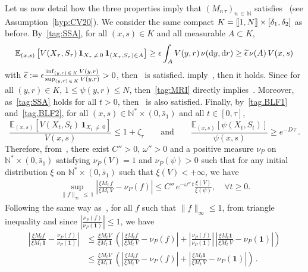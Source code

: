 \documentclass[10pt]{amsart}
\theoremstyle{definition}\newtheorem{defi}[theo]{Definition}\newtheorem{rema}[theo]{Remark}\newtheorem{exam}[theo]{Example}\newtheorem{exem}[theo]{Example}\newtheorem{nota}[theo]{Notation}
\newcommand{\llbracket}{\mathopen{[\mkern -2.7mu[}}
\newcommand{\rrbracket}{\mathclose{]\mkern -2.7mu]}}
\newcommand{\NN}{\mathbb{N}}
\newcommand{\EE}{\mathbb{E}}
\newcommand{\X}{\NN^* \times (0,\bar s_1)}
\newcommand{\dif}{\mathrm{d}}
\newcommand{\1}{\mathbf{1}}
\let\oldtilde\tilde
\renewcommand*{\tilde}[1]{\mathchoice{\widetilde{#1}}{\widetilde{#1}}{\oldtilde{#1}}{\oldtilde{#1}}}
\let\oldforall\forall
\renewcommand*{\forall}{\mathrel{\oldforall}}
\begin{document}
Let us now detail how the three properties imply that $(M_{n\,\tau})_{n\,\in\,\NN}$ satisfies~\cite[Assumption~G]{CV20} (see Assumption~\ref{hyp:CV20}). We consider the same compact $K=\llbracket 1,N\rrbracket\times [\delta_1,\delta_2]$ as before. By~\eqref{tag:SSA}, for all $(x,s)\in K$ and all measurable $A\subset K$,
\[
\EE_{(x,s)}\left[V(X_\tau,S_\tau)\,\1_{X_\tau\,\neq\,0}\,\1_{\left(X_\tau,S_\tau\right)\in A}\right]
\geq \epsilon \int_A V(y,r)\,\nu(\dif y, \dif r)
\geq \tilde \epsilon\, \nu(A)\,V(x,s)
\]
with $\tilde \epsilon:=\epsilon \frac{\inf_{(y,r)\,\in\,K}V(y,r)}{\sup_{(y,r)\,\in\,K}V(y,r)}>0$, then~\cite[Assumption~(G1)]{CV20} is satisfied. \cite[Assumptions~(A1) and~(A2)]{BCGM} imply~\cite[Assumption~(G2)]{CV20}, then it holds. Since for all $(y,r)\in K$, $1\leq \psi(y,r)\leq N$, then~\eqref{tag:MRI} directly implies~\cite[Assumption~(G3)]{CV20}. Moreover, as~\eqref{tag:SSA} holds for all $t>0$, then~\cite[Assumption~(G4)]{CV20} is also satisfied. Finally, by~\eqref{tag.BLF1} and~\eqref{tag.BLF2}, for all $(x,s)\in \X$ and all $t\in[0,\tau]$,
\[
\frac{\EE_{(x,s)}\left[V(X_t,S_t) \,\1_{X_t\,\neq\,0}\right]}{V(x,s)} \leq 1 + \zeta_\tau
\qquad
\text{and}
\qquad
\frac{\EE_{(x,s)}\left[\psi(X_t, S_t) \right]}{\psi(x,s)} \geq e^{-D\,\tau} \,.
\]
Therefore, from~\cite[Corollary~2.4.]{CV20}, there exist $C''>0$, $\omega''>0$ and a positive measure $\nu_P$ on $\X$ satisfying $\nu_P(V)=1$ and $\nu_P(\psi)>0$ such that for any initial distribution $\xi$ on $\X$ such that $\xi(V)<+\infty$, we have
\begin{align}\label{eq:borne_CV}
\sup_{\|f \|_\infty\,\leq\,1} \left| \frac{\xi M_t\,f}{\xi M_t\,V} -\nu_P(f)\right| \leq C''\,e^{-\omega''\,t} \frac{\xi(V)}{\xi(\psi)}, \quad \forall t\geq 0.
\end{align}
Following the same way as~\cite[Proof of Corollary~3.7]{BCGM}, for all $f$ such that $\|f \|_\infty \leq 1$, from triangle inequality and since $\left|\frac{\nu_P(f)}{\nu_P(\1)}\right|\leq 1$, we have
\begin{align*}
\left|\frac{\xi M_t f}{\xi M_t\,\1} - \frac{\nu_P(f)}{\nu_P(\1)}\right| &\leq
\frac{\xi M_t V}{\xi M_t\,\1}\, \left(
\left|\frac{\xi M_t f}{\xi M_t\,V} - \nu_P(f)\right| +
\left|\frac{\nu_P(f)}{\nu_P(\1)}\right|\,\left| \frac{\xi M_t \1}{\xi M_t\,V} - \nu_P(\1)\right| \right)\\
&\leq
\frac{\xi M_t V}{\xi M_t\,\1}\, \left(
\left| \frac{\xi M_t f}{\xi M_t\,V} - \nu_P(f)\right| +
\left| \frac{\xi M_t \1}{\xi M_t\,V} - \nu_P(\1)\right| \right)\,.
\end{align*}
\end{document}
